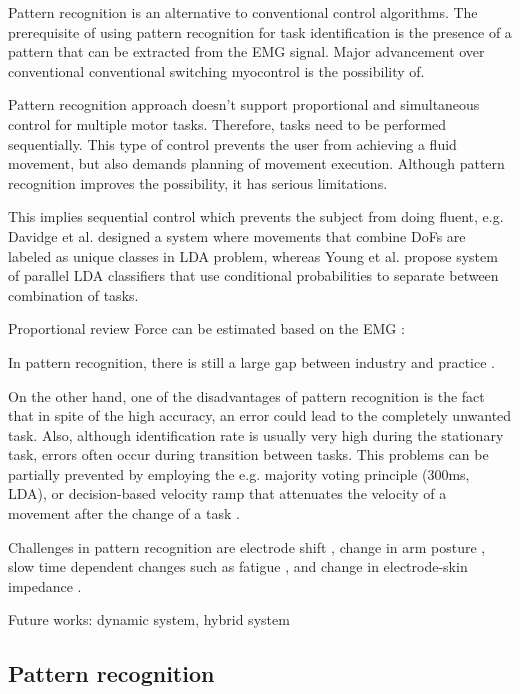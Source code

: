 Pattern recognition is an alternative to conventional control algorithms. The prerequisite of using pattern recognition for task identification is the presence of a pattern that can be extracted from the EMG signal. Major advancement over conventional conventional switching myocontrol is the possibility of.

Pattern recognition approach doesn't support proportional and simultaneous control for multiple motor tasks. Therefore, tasks need to be performed sequentially. This type of control prevents the user from achieving a fluid movement, but also demands planning of movement execution. Although pattern recognition improves the possibility, it has serious limitations. 

This implies sequential control which prevents the subject from doing fluent, e.g. Davidge et al. designed a system where movements that combine DoFs are labeled as unique classes in LDA problem, whereas Young et al. \citep{Young2013} propose system of parallel LDA classifiers that use conditional probabilities to separate between combination of tasks.

Proportional review \citep{Fougner2012}
Force can be estimated based on the EMG : \citep{Staudenmann2010}

In pattern recognition, there is still a large gap between industry and practice \citep{Jiang2012}.

On the other hand, one of the disadvantages of pattern recognition is the fact that in spite of the high accuracy, an error could lead to the completely unwanted task. Also, although identification rate is usually very high during the stationary task, errors often occur during transition between tasks. This problems can be partially prevented by employing the e.g. majority voting principle \citep{Englehart2003} (300ms, LDA), or decision-based velocity ramp that attenuates the velocity of a movement after the change of a task \citep{Simon2011}. 

Challenges in pattern recognition are electrode shift \citep{Hargrove2008, Young2011}, change in arm posture \citep{Fougner2011}, slow time dependent changes \citep{Farina2014} such as fatigue \citep{Tkach2010}, and change in electrode-skin impedance \citep{Clancy2002a}.


Future works: dynamic system, hybrid system

\subsection{Pattern recognition}

